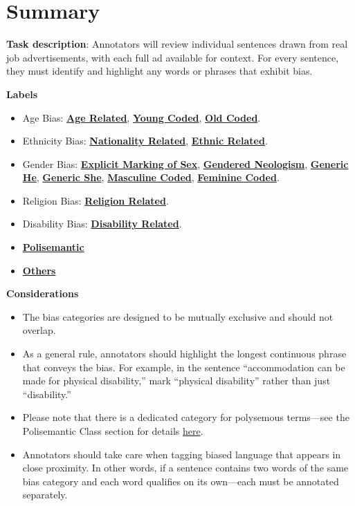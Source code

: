 \documentclass[
]{book}
\begin{document}
\chapter{Summary}\label{summary}

\textbf{Task description}: Annotators will review individual sentences drawn from real job advertisements, with each full ad available for context. For every sentence, they must identify and highlight any words or phrases that exhibit bias.

\textbf{Labels}

\begin{itemize}
\item
  Age Bias:
  \textbf{\hyperref[age-explicit-bias]{{Age Related}}},
  \textbf{\hyperref[age-implicit-bias]{{Young Coded}}},
  \textbf{\hyperref[age-implicit-bias]{{Old Coded}}}.
\item
  Ethnicity Bias:
  \textbf{\hyperref[ethnicity-bias]{{Nationality Related}}},
  \textbf{\hyperref[ethnicity-bias]{{Ethnic Related}}}.
\item
  Gender Bias:
  \textbf{\hyperref[gender-exclusionary-terms]{{Explicit Marking of Sex}}},
  \textbf{\hyperref[gender-exclusionary-terms]{{Gendered Neologism}}},
  \textbf{\hyperref[generic-pronouns]{{Generic He}}},
  \textbf{\hyperref[generic-pronouns]{{Generic She}}},
  \textbf{\hyperref[gender-stereotypical-terms]{{Masculine Coded}}},
  \textbf{\hyperref[gender-stereotypical-terms]{{Feminine Coded}}}.
\item
  Religion Bias:
  \textbf{\hyperref[religion-bias]{{Religion Related}}}.
\item
  Disability Bias:
  \textbf{\hyperref[disability-bias]{{Disability Related}}}.
\item
  \textbf{\hyperref[polisemantic]{{Polisemantic}}}
\item
  \textbf{\hyperref[others]{{Others}}}
\end{itemize}

\textbf{Considerations}

\begin{itemize}
\item
  The bias categories are designed to be mutually exclusive and should not overlap.
\item
  As a general rule, annotators should highlight the longest continuous phrase that conveys the bias. For example, in the sentence ``accommodation can be made for physical disability,'' mark ``physical disability'' rather than just ``disability.''
\item
  Please note that there is a dedicated category for polysemous terms---see the Polisemantic Class section for details \hyperref[polisemantic]{here}.
\item
  Annotators should take care when tagging biased language that appears in close proximity. In other words, if a sentence contains two words of the same bias category and each word qualifies on its own---each must be annotated separately.
\end{itemize}
\end{document}
